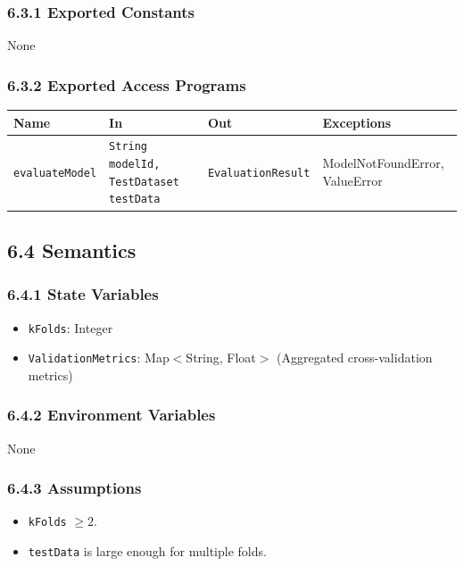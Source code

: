 \documentclass[12pt, titlepage]{article}
\begin{document}
\subsubsection{6.3.1 Exported Constants}
None

\subsubsection{6.3.2 Exported Access Programs}
\begin{center}
\begin{tabular}{p{3.5cm} p{4.5cm} p{4cm} p{3cm}}
\hline
\textbf{Name} & \textbf{In} & \textbf{Out} & \textbf{Exceptions} \\
\hline
\texttt{evaluateModel} & \texttt{String modelId, TestDataset testData} & \texttt{EvaluationResult} & ModelNotFoundError, ValueError \\
\hline
\end{tabular}
\end{center}

\subsection{6.4 Semantics}

\subsubsection{6.4.1 State Variables}
\begin{itemize}
    \item \texttt{kFolds}: Integer
    \item \texttt{ValidationMetrics}: Map$<$String, Float$>$ (Aggregated cross-validation metrics)
\end{itemize}

\subsubsection{6.4.2 Environment Variables}
None

\subsubsection{6.4.3 Assumptions}
\begin{itemize}
    \item \texttt{kFolds} $\geq 2$.
    \item \texttt{testData} is large enough for multiple folds.
\end{itemize}
\end{document}
